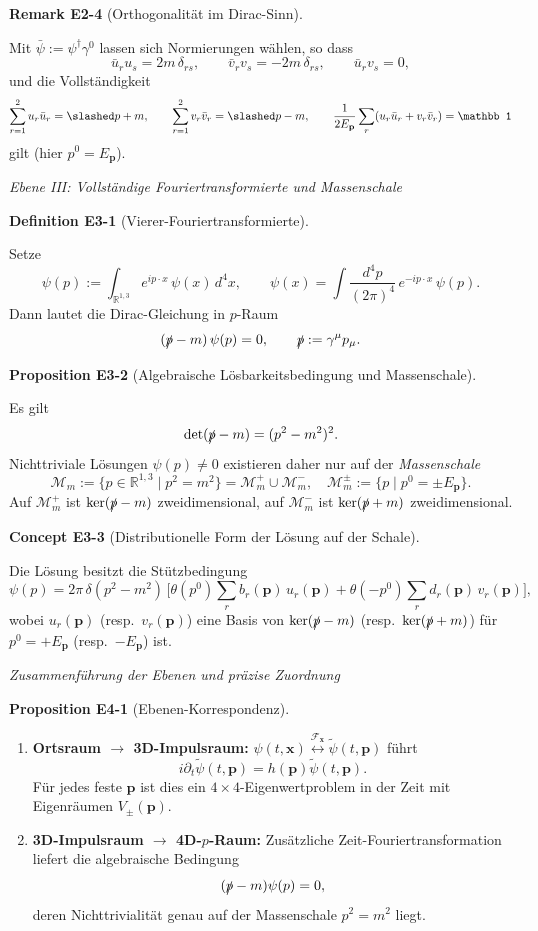 \documentclass[10pt, letterpaper]{article}
\newcommand{\R}{\mathbb{R}}
\newcommand{\CustomHeading}[3]{%
  \par\medskip\noindent%
  \textbf{#1 #2} \textnormal{(#3)}.\enskip%
}
\newenvironment{DEF}[2]{\begin{unitbox}\CustomHeading{Definition}{#1}{#2}}{\end{unitbox}}
\newenvironment{PROP}[2]{\begin{unitbox}\CustomHeading{Proposition}{#1}{#2}}{\end{unitbox}}
\newenvironment{REM}[2]{\begin{unitbox}\CustomHeading{Remark}{#1}{#2}}{\end{unitbox}}
\newenvironment{CONC}[2]{\begin{unitbox}\CustomHeading{Concept}{#1}{#2}}{\end{unitbox}}
\begin{document}
\begin{REM}{E2-4}{Orthogonalität im Dirac-Sinn}
Mit $\bar\psi:=\psi^\dagger\gamma^0$ lassen sich Normierungen wählen, so dass
\[
\bar u_r u_s=2m\,\delta_{rs},\qquad \bar v_r v_s=-2m\,\delta_{rs},\qquad \bar u_r v_s=0,
\]
und die Vollständigkeit
\[
\sum_{r=1}^2 u_r\bar u_r=\slashed p+m,\qquad \sum_{r=1}^2 v_r\bar v_r=\slashed p-m,\qquad
\frac{1}{2E_{\mathbf p}}\sum_r(u_r\bar u_r+v_r\bar v_r)=\mathbb 1
\]
gilt (hier $p^0=E_{\mathbf p}$).
\end{REM}

\emph{Ebene III: Vollständige Fouriertransformierte und Massenschale}

\begin{DEF}{E3-1}{Vierer-Fouriertransformierte}
Setze
\[
\psi(p):=\int_{\R^{1,3}} e^{ip\cdot x}\,\psi(x)\,d^4x,\qquad
\psi(x)=\int\frac{d^4p}{(2\pi)^4}\,e^{-ip\cdot x}\,\psi(p).
\]
Dann lautet die Dirac-Gleichung in $p$-Raum
\[
(\slashed p - m)\,\psi(p)=0,\qquad \slashed p:=\gamma^\mu p_\mu.
\]
\end{DEF}

\begin{PROP}{E3-2}{Algebraische Lösbarkeitsbedingung und Massenschale}
Es gilt
\[
\det(\slashed p - m)=(p^2-m^2)^2.
\]
Nichttriviale Lösungen $\psi(p)\neq 0$ existieren daher nur auf der \emph{Massenschale}
\[
\mathcal M_m:=\{p\in\R^{1,3}\mid p^2=m^2\}=\mathcal M_m^+\cup \mathcal M_m^-,
\quad \mathcal M_m^\pm:=\{p\mid p^0=\pm E_{\mathbf p}\}.
\]
Auf $\mathcal M_m^+$ ist $\ker(\slashed p - m)$ zweidimensional, auf $\mathcal M_m^-$ ist $\ker(\slashed p + m)$ zweidimensional.
\end{PROP}

\begin{CONC}{E3-3}{Distributionelle Form der Lösung auf der Schale}
Die Lösung besitzt die Stützbedingung
\[
\psi(p)=2\pi\,\delta(p^2-m^2)\,\Big[\theta(p^0)\sum_{r} b_r(\mathbf p)\,u_r(\mathbf p)
+\theta(-p^0)\sum_{r} d_r(\mathbf p)\,v_r(\mathbf p)\Big],
\]
wobei $u_r(\mathbf p)$ (resp.\ $v_r(\mathbf p)$) eine Basis von $\ker(\slashed p-m)$ (resp.\ $\ker(\slashed p+m)$) für $p^0=+E_{\mathbf p}$ (resp.\ $-E_{\mathbf p}$) ist.
\end{CONC}

\emph{Zusammenführung der Ebenen und präzise Zuordnung}

\begin{PROP}{E4-1}{Ebenen-Korrespondenz}
\begin{enumerate}
\item \textbf{Ortsraum $\to$ 3D-Impulsraum:}  
$\psi(t,\mathbf x)\stackrel{\mathcal F_{\mathbf x}}{\longleftrightarrow}\tilde\psi(t,\mathbf p)$ führt
\[
i\partial_t\tilde\psi(t,\mathbf p)=h(\mathbf p)\tilde\psi(t,\mathbf p).
\]
Für jedes feste $\mathbf p$ ist dies ein $4\times 4$-Eigenwertproblem in der Zeit mit Eigenräumen $V_\pm(\mathbf p)$.
\item \textbf{3D-Impulsraum $\to$ 4D-$p$-Raum:}  
Zusätzliche Zeit-Fouriertransformation liefert die algebraische Bedingung
\[
(\slashed p-m)\psi(p)=0,
\]
deren Nichttrivialität genau auf der Massenschale $p^2=m^2$ liegt.
\end{enumerate}
\end{PROP}
\end{document}
